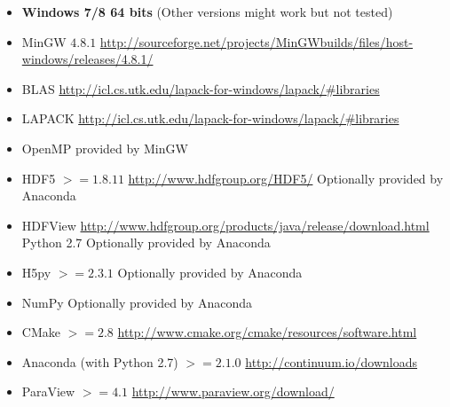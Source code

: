 \documentclass[12pt]{article}
\begin{document}
\begin{itemize}
\item \textbf{Windows 7/8 64 bits} (Other versions might work but not tested)
\item MinGW $4.8.1$ \url{http://sourceforge.net/projects/MinGWbuilds/files/host-windows/releases/4.8.1/}
\item BLAS \url{http://icl.cs.utk.edu/lapack-for-windows/lapack/\#libraries} 
\item LAPACK  \url{http://icl.cs.utk.edu/lapack-for-windows/lapack/\#libraries} 
\item OpenMP provided by MinGW
\item HDF5 $>=1.8.11$  \url{http://www.hdfgroup.org/HDF5/}  Optionally provided by Anaconda
\item HDFView \url{http://www.hdfgroup.org/products/java/release/download.html}
Python 2.7 Optionally provided by Anaconda
\item H5py $>= 2.3.1$ Optionally provided by Anaconda
\item NumPy Optionally provided by Anaconda
\item CMake $>= 2.8$ \url{http://www.cmake.org/cmake/resources/software.html}
\item Anaconda (with Python 2.7) $>= 2.1.0$ \url{http://continuum.io/downloads} 
\item ParaView $>=4.1$  \url{http://www.paraview.org/download/}
\end{itemize}
\end{document}
